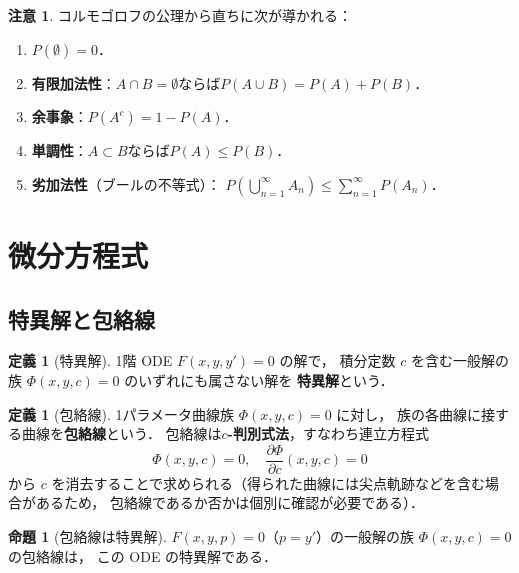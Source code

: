\documentclass[dvipdfmx,a4paper,12pt]{jsarticle}
\theoremstyle{definition}
\newtheorem{definition}[theorem]{定義}
\newtheorem{proposition}[theorem]{命題}
\newtheorem{remark}[theorem]{注意}
\begin{document}
\begin{remark}
    コルモゴロフの公理から直ちに次が導かれる：
    \begin{enumerate}
        \item $P(\emptyset)=0$．
        \item \textbf{有限加法性}：$A\cap B=\emptyset$ならば$P(A\cup B)=P(A)+P(B)$．
        \item \textbf{余事象}：$P(A^c)=1-P(A)$．
        \item \textbf{単調性}：$A\subset B$ならば$P(A)\leq P(B)$．
        \item \textbf{劣加法性}（ブールの不等式）：
        $P\!\left(\bigcup_{n=1}^{\infty}A_n\right)\leq\sum_{n=1}^{\infty}P(A_n)$．
    \end{enumerate}
\end{remark}


\section{微分方程式}

\subsection{特異解と包絡線}

\begin{definition}[特異解]
    1階 ODE $F(x,y,y')=0$ の解で，
    積分定数 $c$ を含む一般解の族 $\Phi(x,y,c)=0$ のいずれにも属さない解を
    \textbf{特異解}という．
\end{definition}

\begin{definition}[包絡線]
    1パラメータ曲線族 $\Phi(x,y,c)=0$ に対し，
    族の各曲線に接する曲線を\textbf{包絡線}という．
    包絡線は\textbf{$c$-判別式法}，すなわち連立方程式
    \begin{equation*}
        \Phi(x,y,c)=0,\quad \frac{\partial\Phi}{\partial c}(x,y,c)=0
    \end{equation*}
    から $c$ を消去することで求められる（得られた曲線には尖点軌跡などを含む場合があるため，
    包絡線であるか否かは個別に確認が必要である）．
\end{definition}

\begin{proposition}[包絡線は特異解]\label{prop:envelope-singular}
    $F(x,y,p)=0$（$p=y'$）の一般解の族 $\Phi(x,y,c)=0$ の包絡線は，
    この ODE の特異解である．
\end{proposition}
\end{document}
